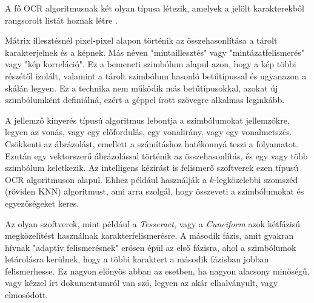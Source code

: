 
A fő OCR algoritmusnak két olyan típusa létezik, amelyek a jelölt karakterekből rangsorolt listát hoznak létre \cite{bradski2000opencv}.

Mátrix illesztésnél pixel-pixel alapon történik az összehasonlítása a tárolt karakterjelnek és a képnek. Más néven "mintaillesztés" vagy "mintázatfelismerés" vagy "kép korreláció". Ez a bemeneti szimbólum alapul azon, hogy a kép többi részétől izolált, valamint a tárolt szimbólum hasonló betűtípussal és ugyanazon a skálán legyen. Ez a technika nem működik más betűtípusokkal, azokat új szimbólumként definiálná, ezért a géppel írott szövegre alkalmas leginkább.

A jellemző kinyerés típusú algoritmus lebontja a szimbólumokat jellemzőkre, legyen az vonás, vagy egy előfordulás, egy vonalirány, vagy egy vonalmetszés. Csökkenti az ábrázolást, emellett a számításhoz hatékonnyá teszi a folyamatot. Ezután egy vektorszerű ábrázolással történik az összehasonlítás, és egy vagy több szimbólum keletkezik. Az intelligens kézírást is felismerő szoftverek ezen típusú OCR algoritmuson alapul. Ehhez például használják a $k$-legközelebbi szomszéd (röviden KNN) algoritmust, ami arra szolgál, hogy összeveti a szimbólumokat és egyezőségeket keres.

Az olyan szoftverek, mint például a \textit{Tesseract}, vagy a \textit{Cuneiform} azok kétfázisú megközelítést használnak karakterfelismerésre. A második fázis, amit gyakran hívnak "adaptív felismerésnek" erősen épül az első fázisra, ahol a szimbólumok letárolásra kerülnek, hogy a többi karaktert a második fázisban jobban felismerhesse. Ez nagyon előnyös abban az esetben, ha nagyon alacsony minőségű, vagy kézzel írt dokumentumról van szó, legyen az akár elhalványult, vagy elmosódott.
